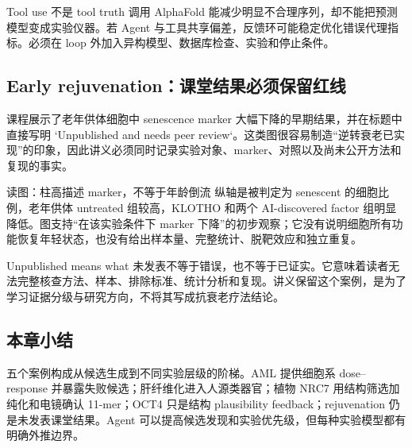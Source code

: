 \begin{warningbox}{Tool use 不是 tool truth}
调用 AlphaFold 能减少明显不合理序列，却不能把预测模型变成实验仪器。若 Agent 与工具共享偏差，反馈环可能稳定优化错误代理指标。必须在 loop 外加入异构模型、数据库检查、实验和停止条件。
\end{warningbox}

\subsection{Early rejuvenation：课堂结果必须保留红线}

课程展示了老年供体细胞中 senescence marker 大幅下降的早期结果，并在标题中直接写明 `Unpublished and needs peer review`。这类图很容易制造“逆转衰老已实现”的印象，因此讲义必须同时记录实验对象、marker、对照以及尚未公开方法和复现的事实。


\begin{knowledgebox}{读图：柱高描述 marker，不等于年龄倒流}
纵轴是被判定为 senescent 的细胞比例，老年供体 untreated 组较高，KLOTHO 和两个 AI-discovered factor 组明显降低。图支持“在该实验条件下 marker 下降”的初步观察；它没有说明细胞所有功能恢复年轻状态，也没有给出样本量、完整统计、脱靶效应和独立重复。
\end{knowledgebox}

\begin{warningbox}{Unpublished means what}
未发表不等于错误，也不等于已证实。它意味着读者无法完整核查方法、样本、排除标准、统计分析和复现。讲义保留这个案例，是为了学习证据分级与研究方向，不将其写成抗衰老疗法结论。
\end{warningbox}


\subsection{本章小结}

五个案例构成从候选生成到不同实验层级的阶梯。AML 提供细胞系 dose--response 并暴露失败候选；肝纤维化进入人源类器官；植物 NRC7 用结构筛选加纯化和电镜确认 11-mer；OCT4 只是结构 plausibility feedback；rejuvenation 仍是未发表课堂结果。Agent 可以提高候选发现和实验优先级，但每种实验模型都有明确外推边界。

